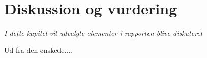\chapter{Diskussion og vurdering}\label{kap:diskussion}
\emph{I dette kapitel vil udvalgte elementer i rapporten blive diskuteret}



Ud fra den ønskede....
